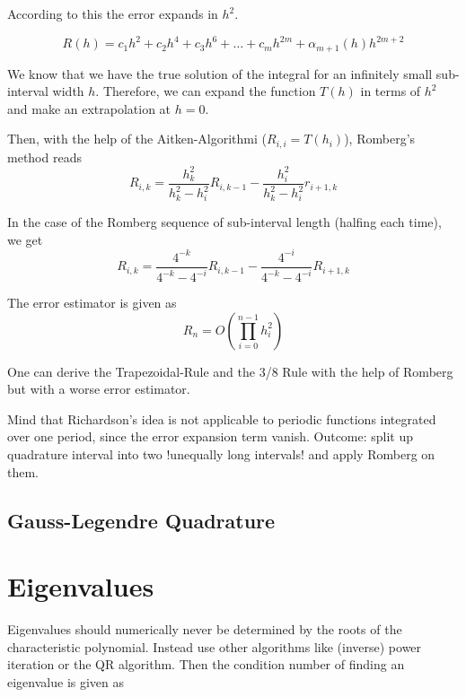 \documentclass[
    a4paper,
    11pt
]{article}
\begin{document}
According to this the error expands in $h^2$. 

\begin{equation}
    R(h) = c_1 h^2 + c_2 h^4 + c_3 h^6 + \dots + c_m h^{2m} +
    \alpha_{m+1}(h)h^{2m+2}
\end{equation}

We know that we have the true
solution of the integral for an infinitely small sub-interval width $h$.
Therefore, we can expand the function $T(h)$ in terms of $h^2$ and make an
extrapolation at $h=0$.

Then, with the help of the Aitken-Algorithmi ($R_{i,i} = T(h_i)$), Romberg's
method reads
\begin{equation}
    R_{i,k} = \frac{h_k^2}{h_k^2 - h_i^2}R_{i, k-1} - \frac{h_i^2}{h_k^2 -
    h_i^2} r_{i+1, k}
\end{equation}

In the case of the Romberg sequence of sub-interval length (halfing each time),
we get
\begin{equation}
    R_{i, k} = \frac{4^{-k}}{4^{-k} - 4^{-i}} R_{i, k-1} - \frac{4^{-i}}{4^{-k}
    - 4^{-i}} R_{i+1, k}
\end{equation}

The error estimator is given as
\begin{equation}
    R_n = O(\prod_{i=0}^{n-1} h_i^2)
\end{equation}

One can derive the Trapezoidal-Rule and the 3/8 Rule with the help of Romberg
but with a worse error estimator.

Mind that Richardson's idea is not applicable to periodic functions integrated
over one period, since the error expansion term vanish. Outcome: split up
quadrature interval into two !unequally long intervals! and apply Romberg on
them.

\subsection{Gauss-Legendre Quadrature}


\section{Eigenvalues}

Eigenvalues should numerically never be determined by the roots of the
characteristic polynomial. Instead use other algorithms like (inverse) power
iteration or the QR algorithm. Then the condition number of finding an
eigenvalue is given as
\end{document}
